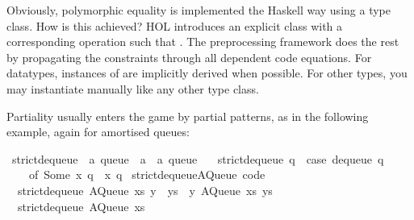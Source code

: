 \begin{isabellebody}
\begin{isamarkuptext}
\begin{typewriter}
  \end{typewriter}%
\end{isamarkuptext}%
\isamarkuptrue%
%
\endisatagquote
{\isafoldquote}%
%
\isadelimquote
%
\endisadelimquote
%
\begin{isamarkuptext}%
\noindent Obviously, polymorphic equality is implemented the Haskell
  way using a type class.  How is this achieved?  HOL introduces an
  explicit class  with a corresponding operation  such that .  The preprocessing
  framework does the rest by propagating the  constraints
  through all dependent code equations.  For datatypes, instances of
   are implicitly derived when possible.  For other types,
  you may instantiate  manually like any other type class.%
\end{isamarkuptext}%
\isamarkuptrue%
%
\isamarkuptrue%
%
\begin{isamarkuptext}%
Partiality usually enters the game by partial patterns, as
  in the following example, again for amortised queues:%
\end{isamarkuptext}%
\isamarkuptrue%
%
\isadelimquote
%
\endisadelimquote
%
\isatagquote
{}\isamarkupfalse%
\ strict{\isacharunderscore}dequeue\ {\isacharcolon}{\isacharcolon}\ {\isachardoublequoteopen}{\isacharprime}a\ queue\ {\isasymRightarrow}\ {\isacharprime}a\ {\isasymtimes}\ {\isacharprime}a\ queue{\isachardoublequoteclose}\ \isanewline
\ \ {\isachardoublequoteopen}strict{\isacharunderscore}dequeue\ q\ {\isacharequal}\ {\isacharparenleft}case\ dequeue\ q\isanewline
\ \ \ \ of\ {\isacharparenleft}Some\ x{\isacharcomma}\ q{\isacharprime}{\isacharparenright}\ {\isasymRightarrow}\ {\isacharparenleft}x{\isacharcomma}\ q{\isacharprime}{\isacharparenright}{\isacharparenright}{\isachardoublequoteclose}\isanewline
\isanewline
{}\isamarkupfalse%
\ strict{\isacharunderscore}dequeue{\isacharunderscore}AQueue\ {\isacharbrackleft}code{\isacharbrackright}{\isacharcolon}\isanewline
\ \ {\isachardoublequoteopen}strict{\isacharunderscore}dequeue\ {\isacharparenleft}AQueue\ xs\ {\isacharparenleft}y\ {\isacharhash}\ ys{\isacharparenright}{\isacharparenright}\ {\isacharequal}\ {\isacharparenleft}y{\isacharcomma}\ AQueue\ xs\ ys{\isacharparenright}{\isachardoublequoteclose}\isanewline
\ \ {\isachardoublequoteopen}strict{\isacharunderscore}dequeue\ {\isacharparenleft}AQueue\ xs\ {\isacharbrackleft}{\isacharbrackright}{\isacharparenright}\ {\isacharequal}\isanewline

\end{isabellebody}
